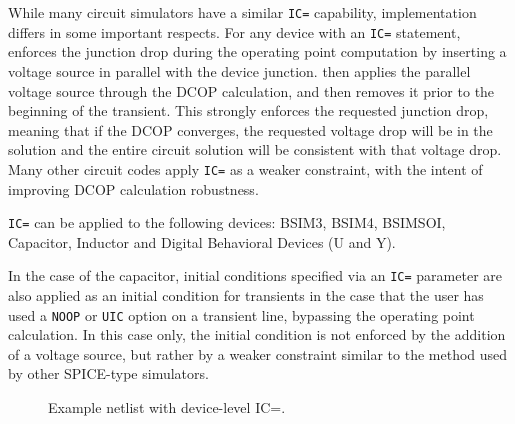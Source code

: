 While many circuit simulators have a similar \texttt{IC=} capability,
\Xyce{} implementation differs in some important respects.  For any
device with an \texttt{IC=} statement, \Xyce{} enforces the junction
drop during the operating point computation by inserting a voltage
source in parallel with the device junction.  \Xyce{} then applies the
parallel voltage source through the DCOP calculation, and then removes
it prior to the beginning of the transient.  This strongly enforces
the requested junction drop, meaning that if the DCOP converges, the
requested voltage drop will be in the solution and the entire circuit
solution will be consistent with that voltage drop.  Many other
circuit codes apply \texttt{IC=} as a weaker constraint, with the
intent of improving DCOP calculation robustness.

\texttt{IC=} can be applied to the following devices:  BSIM3, BSIM4, BSIMSOI,
Capacitor, Inductor and Digital Behavioral Devices (U and Y).

In the case of the capacitor, initial conditions specified via an
\texttt{IC=} parameter are also applied as an initial condition for
transients in the case that the user has used a \texttt{NOOP} or
\texttt{UIC} option on a transient line, bypassing the operating point
calculation.  In this case only, the initial condition is not enforced by
the addition of a voltage source, but rather by a weaker constraint
similar to the method used by other SPICE-type simulators.

\begin{figure}[htbp]
\begin{centering}
\caption[Example netlist with device-level IC=.]{Example netlist with device-level IC=.\label{IC_Netlist_1}}
\end{centering}
\end{figure}


